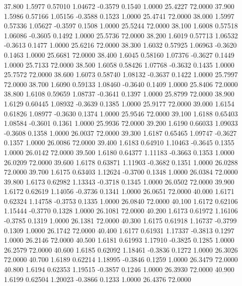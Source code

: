   37.800   1.5977   0.57010   1.04672  -0.3579   0.1540   1.0000  25.4227  72.0000
  37.900   1.5986   0.57166   1.05156  -0.3588   0.1523   1.0000  25.4741  72.0000
  38.000   1.5997   0.57336   1.05627  -0.3597   0.1508   1.0000  25.5244  72.0000
  38.100   1.6008   0.57518   1.06086  -0.3605   0.1492   1.0000  25.5736  72.0000
  38.200   1.6019   0.57713   1.06532  -0.3613   0.1477   1.0000  25.6216  72.0000
  38.300   1.6032   0.57925   1.06963  -0.3620   0.1463   1.0000  25.6681  72.0000
  38.400   1.6045   0.58160   1.07376  -0.3627   0.1449   1.0000  25.7133  72.0000
  38.500   1.6058   0.58426   1.07768  -0.3632   0.1435   1.0000  25.7572  72.0000
  38.600   1.6073   0.58740   1.08132  -0.3637   0.1422   1.0000  25.7997  72.0000
  38.700   1.6090   0.59133   1.08460  -0.3640   0.1409   1.0000  25.8406  72.0000
  38.800   1.6108   0.59659   1.08737  -0.3641   0.1397   1.0000  25.8799  72.0000
  38.900   1.6129   0.60445   1.08932  -0.3639   0.1385   1.0000  25.9177  72.0000
  39.000   1.6154   0.61826   1.08977  -0.3630   0.1374   1.0000  25.9546  72.0000
  39.100   1.6188   0.65403   1.08584  -0.3601   0.1361   1.0000  25.9936  72.0000
  39.200   1.6190   0.66033   1.09033  -0.3608   0.1358   1.0000  26.0037  72.0000
  39.300   1.6187   0.65465   1.09747  -0.3627   0.1357   1.0000  26.0086  72.0000
  39.400   1.6183   0.64910   1.10463  -0.3645   0.1355   1.0000  26.0142  72.0000
  39.500   1.6180   0.64377   1.11183  -0.3663   0.1353   1.0000  26.0209  72.0000
  39.600   1.6178   0.63871   1.11903  -0.3682   0.1351   1.0000  26.0288  72.0000
  39.700   1.6175   0.63403   1.12624  -0.3700   0.1348   1.0000  26.0384  72.0000
  39.800   1.6173   0.62982   1.13343  -0.3718   0.1345   1.0000  26.0502  72.0000
  39.900   1.6172   0.62619   1.14056  -0.3736   0.1341   1.0000  26.0651  72.0000
  40.000   1.6171   0.62324   1.14758  -0.3753   0.1335   1.0000  26.0840  72.0000
  40.100   1.6172   0.62106   1.15444  -0.3770   0.1328   1.0000  26.1081  72.0000
  40.200   1.6173   0.61972   1.16106  -0.3785   0.1319   1.0000  26.1381  72.0000
  40.300   1.6175   0.61918   1.16737  -0.3799   0.1309   1.0000  26.1742  72.0000
  40.400   1.6177   0.61931   1.17337  -0.3813   0.1297   1.0000  26.2146  72.0000
  40.500   1.6181   0.61993   1.17910  -0.3825   0.1285   1.0000  26.2579  72.0000
  40.600   1.6185   0.62092   1.18461  -0.3836   0.1272   1.0000  26.3026  72.0000
  40.700   1.6189   0.62214   1.18995  -0.3846   0.1259   1.0000  26.3479  72.0000
  40.800   1.6194   0.62353   1.19515  -0.3857   0.1246   1.0000  26.3930  72.0000
  40.900   1.6199   0.62504   1.20023  -0.3866   0.1233   1.0000  26.4376  72.0000
